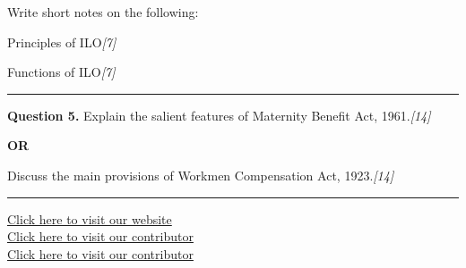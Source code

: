 \documentclass[11pt,a4paper]{article}
\newcommand{\pts}[1]{\hfill   \textit{[#1]}}
\begin{document}
Write short notes on the following:

\begin{parts}
  \item Principles of ILO\pts{7}
  \item Functions of ILO\pts{7}
\end{parts}

\medskip\rule{\linewidth}{0.2pt}




\noindent   \textbf{Question 5.}
Explain the salient features of Maternity Benefit Act, 1961.\pts{14}

\centerline{   \textbf{OR}}

Discuss the main provisions of Workmen Compensation Act, 1923.\pts{14}

\vfill
\rule{\linewidth}{0.4pt}

\begin{center}\small
\href{https://bhu-exam.vercel.app/}{Click here to visit our website}\\[4pt]
\href{https://me-aryan.vercel.app/}{Click here to visit our contributor}\\[4pt]
\href{https://quashan-me.vercel.app/}{Click here to visit our contributor}
\end{center}
\end{document}
